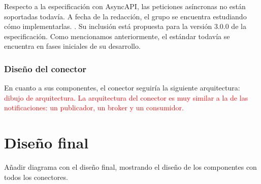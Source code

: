 Respecto a la especificación con AsyncAPI, las peticiones asíncronas no están soportadas todavía. A fecha de la redacción, el grupo se encuentra estudiando cómo implementarlas. . Su inclusión está propuesta para la versión 3.0.0 de la especificación. Como mencionamos anteriormente, el estándar todavía se encuentra en fases iniciales de su desarrollo.

\subsubsection{Diseño del conector}

En cuanto a sus componentes, el conector seguiría la siguiente arquitectura: \textcolor{red}{dibujo de arquitectura. La arquitectura del conector es muy similar a la de las notificaciones: un publicador, un broker y un consumidor.}

\section{Diseño final}

Añadir diagrama con el diseño final, mostrando el diseño de los componentes con todos los conectores.
